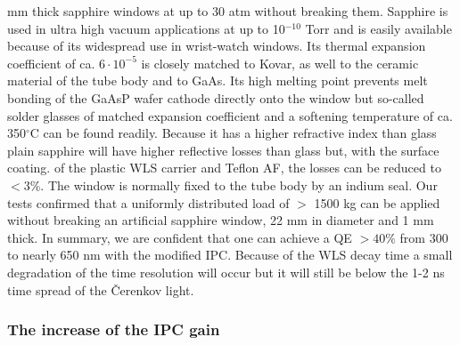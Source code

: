 mm thick sapphire windows at up to 30 atm without breaking them. Sapphire is
used in ultra high vacuum applications at up to 10$^{-10}$ Torr and is
easily available because of its widespread use in wrist-watch windows. Its
thermal expansion coefficient of ca. $6\cdot 10^{-5}$ is closely matched to
Kovar, as well to the ceramic material of the tube body and to GaAs. Its
high melting point prevents melt bonding of the GaAsP wafer cathode directly
onto the window but so-called solder glasses of matched expansion
coefficient and a softening temperature of ca. 350$^{\circ }$C can be found
readily. Because it has a higher refractive index than glass plain sapphire
will have higher reflective losses than glass but, with the surface coating.
of the plastic WLS carrier and Teflon AF, the losses can be reduced to $<3\%$.
The window is normally fixed to the tube body by an indium seal. Our tests
confirmed that a 
uniformly distributed load of $\mathrm{>}$ 1500 kg can be applied without
breaking an artificial sapphire window, 22 mm in diameter and 1 mm thick. In
summary, we are confident that one can achieve a QE $>40\%$ from 300 to
nearly 650 nm with the modified IPC. Because of the WLS decay time a small
degradation of the time resolution will occur but it will still be below the
1-2 ns time spread of the \v{C}erenkov light.

\subsubsection{The increase of the IPC gain}


